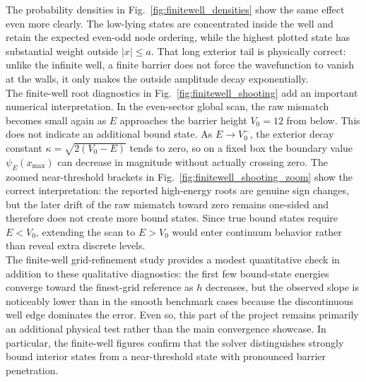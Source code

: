 \documentclass[11pt]{article}
\begin{document}
\begin{refsection}
            The probability densities in Fig.~\ref{fig:finitewell_densities} show the same effect even more clearly. The low-lying states are concentrated inside the well and retain the expected even-odd node ordering, while the highest plotted state has substantial weight outside $|x|\le a$. That long exterior tail is physically correct: unlike the infinite well, a finite barrier does not force the wavefunction to vanish at the walls, it only makes the outside amplitude decay exponentially. \\

            The finite-well root diagnostics in Fig.~\ref{fig:finitewell_shooting} add an important numerical interpretation. In the even-sector global scan, the raw mismatch becomes small again as $E$ approaches the barrier height $V_0=12$ from below. This does not indicate an additional bound state. As $E\to V_0^{-}$, the exterior decay constant $\kappa=\sqrt{2(V_0-E)}$ tends to zero, so on a fixed box the boundary value $\psi_E(x_{\max})$ can decrease in magnitude without actually crossing zero. The zoomed near-threshold brackets in Fig.~\ref{fig:finitewell_shooting_zoom} show the correct interpretation: the reported high-energy roots are genuine sign changes, but the later drift of the raw mismatch toward zero remains one-sided and therefore does not create more bound states. Since true bound states require $E<V_0$, extending the scan to $E>V_0$ would enter continuum behavior rather than reveal extra discrete levels. \\

            The finite-well grid-refinement study provides a modest quantitative check in addition to these qualitative diagnostics: the first few bound-state energies converge toward the finest-grid reference as $h$ decreases, but the observed slope is noticeably lower than in the smooth benchmark cases because the discontinuous well edge dominates the error. Even so, this part of the project remains primarily an additional physical test rather than the main convergence showcase. In particular, the finite-well figures confirm that the solver distinguishes strongly bound interior states from a near-threshold state with pronounced barrier penetration. \\

            \begin{figure}[p]
                \centering


\end{figure}
\end{refsection}
\end{document}
